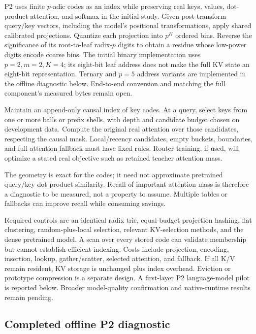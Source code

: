 \documentclass[11pt]{article}
\begin{document}
P2 uses finite \(p\)-adic codes as an index while preserving real keys, values,
dot-product attention, and softmax in the initial study. Given post-transform
query/key vectors, including the model's positional transformations, apply
shared calibrated projections. Quantize each projection into \(p^K\) ordered
bins. Reverse the significance of its root-to-leaf radix-\(p\) digits to obtain
a residue whose low-power digits encode coarse bins. The initial binary
implementation uses \(p=2,m=2,K=4\); its eight-bit leaf address does not make
the full KV state an eight-bit representation. Ternary and \(p=5\) address
variants are implemented in the offline diagnostic below. End-to-end conversion
and matching the full component's measured bytes remain open.

Maintain an append-only causal index of key codes. At a query, select keys
from one or more balls or prefix shells, with depth and candidate budget chosen
on development data. Compute the original real attention over those candidates,
respecting the causal mask. Local/recency candidates, empty buckets, boundaries,
and full-attention fallback must have fixed rules. Router training, if used,
will optimize a stated real objective such as retained teacher attention mass.

The geometry is exact for the codes; it need not approximate pretrained
query/key dot-product similarity. Recall of important attention mass is therefore
a diagnostic to be measured, not a property to assume. Multiple tables or
fallbacks can improve recall while consuming savings.

Required controls are an identical radix trie, equal-budget projection hashing,
flat clustering, random-plus-local selection, relevant KV-selection methods,
and the dense pretrained model. A scan over every stored code can validate
membership but cannot establish efficient indexing. Costs include projection,
encoding, insertion, lookup, gather/scatter, selected attention, and fallback.
If all K/V remain resident, KV storage is unchanged plus index overhead.
Eviction or prototype compression is a separate design.
A first-layer P2 language-model pilot is reported below. Broader model-quality
confirmation and native-runtime results remain pending.

\subsection{Completed offline P2 diagnostic}
\end{document}

